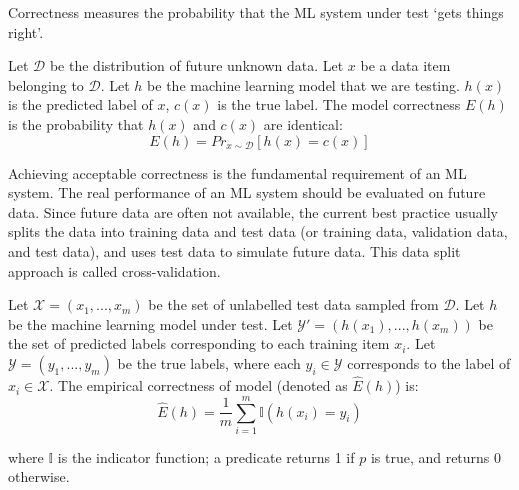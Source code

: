 Correctness measures the probability that the ML system under test `gets things right'.
\begin{definition}[Correctness]
Let $\mathcal{D}$ be the distribution of future unknown data.
Let $x$ be a data item belonging to $\mathcal{D}$.
Let $h$ be the machine learning model that we are testing.
$h(x)$ is the predicted label of $x$, $c(x)$ is the true label.
The model correctness $E(h)$ is the probability that $h(x)$ and $c(x)$ are identical:
\begin{equation}
E(h) = Pr_{ x \sim \mathcal{D}}[h(x)=c(x)]
\end{equation}
\end{definition}
Achieving acceptable correctness is the fundamental requirement of an ML system. 
The real performance of an ML system should be evaluated on future data. Since future data are often not available, the current best practice usually splits the data into training data and test data (or training data, validation data, and test data), and uses test data to simulate future data.
This data split approach is called cross-validation.
\begin{definition}
Let $\mathcal{X}=(x_1,...,x_m)$ be the set of unlabelled test data sampled from $\mathcal{D}$.
Let $h$ be the machine learning model under test.
Let $\mathcal{Y'}=(h(x_1),...,h(x_m))$ be the set of predicted labels corresponding to each training item $x_i$. 
Let $\mathcal{Y}=(y_1,...,y_m)$ be the true labels, where each $y_i\in\mathcal{Y}$ corresponds to the label of $x_i\in\mathcal{X}$.
The empirical correctness of model (denoted as $\hat{E}(h)$) is:
\begin{equation}
    \hat{E}(h)= \frac{1}{m}\sum_{i=1}^{m}\mathbb{I}(h(x_i) = y_i)
\end{equation}
\end{definition}
where $\mathbb{I}$ is the indicator function;
a predicate returns 1 if $p$ is true, and returns 0 otherwise.

